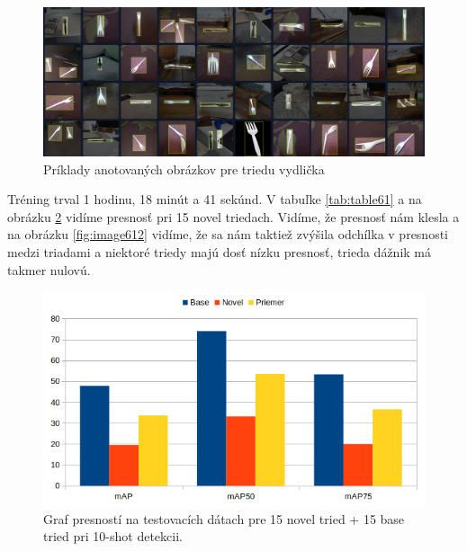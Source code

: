 \begin{figure}[H]
\centering
\includegraphics[width=\textwidth]{images/fork_example_annotations.png}
\caption{Príklady anotovaných obrázkov pre triedu vydlička}
\label{fig:image6009}
\end{figure}

Tréning trval 1 hodinu, 18 minút a 41 sekúnd. V tabuľke \ref{tab:table61} a na obrázku \ref{fig:image63} vidíme presnosť pri 15 novel triedach. Vidíme, že presnosť nám klesla a na obrázku \ref{fig:image612} vidíme, že sa nám taktiež zvýšila odchílka v presnosti medzi triadami a niektoré triedy majú dosť nízku presnosť, trieda dážnik má takmer nulovú.

\begin{figure}[H]
\centering
\includegraphics[width=\textwidth]{images/15novel_chart.png}
\caption{Graf presností na testovacích dátach pre 15 novel tried + 15 base tried pri 10-shot detekcii.}
\label{fig:image63}
\end{figure}

